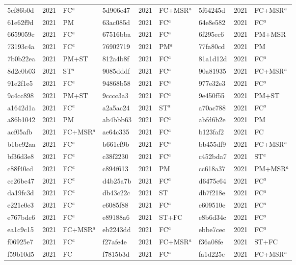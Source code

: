 \begin{longtable}{lll@{\hspace{10pt}}lll@{\hspace{10pt}}lll}
5cf86b0d & 2021 & FC$^{a}$ & 5d906e47 & 2021 & FC+MSR$^{a}$ & 5f64245d & 2021 & FC+MSR$^{a}$ \\
61e62f9d & 2021 & PM & 63ac085d & 2021 & FC$^{a}$ & 64e8e582 & 2021 & FC$^{a}$ \\
6659059c & 2021 & FC$^{a}$ & 67516bba & 2021 & FC$^{a}$ & 6f295ec6 & 2021 & PM+MSR \\
73193c4a & 2021 & FC$^{a}$ & 76902719 & 2021 & PM$^{a}$ & 77fa80cd & 2021 & PM \\
7b0b22ea & 2021 & PM+ST & 812a4b8f & 2021 & FC$^{a}$ & 81a1d12d & 2021 & FC$^{a}$ \\
8d2c0b03 & 2021 & ST$^{a}$ & 9085dddf & 2021 & FC$^{a}$ & 90a81935 & 2021 & FC+MSR$^{a}$ \\
91e2f1e5 & 2021 & FC$^{a}$ & 94868b58 & 2021 & FC$^{a}$ & 977e32e3 & 2021 & FC$^{a}$ \\
9c4cc898 & 2021 & PM+ST & 9cccc3a3 & 2021 & FC$^{a}$ & 9e450f55 & 2021 & PM+ST \\
a1642d1a & 2021 & FC$^{a}$ & a2a5ac24 & 2021 & ST$^{a}$ & a70ac788 & 2021 & FC$^{a}$ \\
a86b1042 & 2021 & PM & ab4bbb63 & 2021 & FC$^{a}$ & abfd6b2e & 2021 & PM \\
acf05afb & 2021 & FC+MSR$^{a}$ & ae64c335 & 2021 & FC$^{a}$ & b123faf2 & 2021 & FC \\
b1bc92aa & 2021 & FC$^{a}$ & b661cf9b & 2021 & FC$^{a}$ & bb455df9 & 2021 & FC+MSR$^{a}$ \\
bf36d3e8 & 2021 & FC$^{a}$ & c38f2230 & 2021 & FC$^{a}$ & c452bda7 & 2021 & ST$^{a}$ \\
c88f40cd & 2021 & FC$^{a}$ & c894f613 & 2021 & PM & cc618a37 & 2021 & PM+MSR$^{a}$ \\
ce26be47 & 2021 & FC$^{a}$ & d4b25a7b & 2021 & FC$^{a}$ & d6475c64 & 2021 & FC$^{a}$ \\
da19fc3d & 2021 & FC$^{a}$ & db43c22c & 2021 & ST & db7f218e & 2021 & FC$^{a}$ \\
e221e0e3 & 2021 & FC$^{a}$ & e6085f88 & 2021 & FC$^{a}$ & e609510e & 2021 & FC$^{a}$ \\
e767bde6 & 2021 & FC$^{a}$ & e89188a6 & 2021 & ST+FC & e8b6d34c & 2021 & FC$^{a}$ \\
ea1c9c15 & 2021 & FC+MSR$^{a}$ & eb2243dd & 2021 & FC$^{a}$ & ebbe7cec & 2021 & FC$^{a}$ \\
f06925e7 & 2021 & FC$^{a}$ & f27afe4e & 2021 & FC+MSR$^{a}$ & f36a08fe & 2021 & ST+FC \\
f59b10d5 & 2021 & FC & f7815b3d & 2021 & FC$^{a}$ & fa1d225c & 2021 & FC+MSR$^{a}$ \\

\end{longtable}
